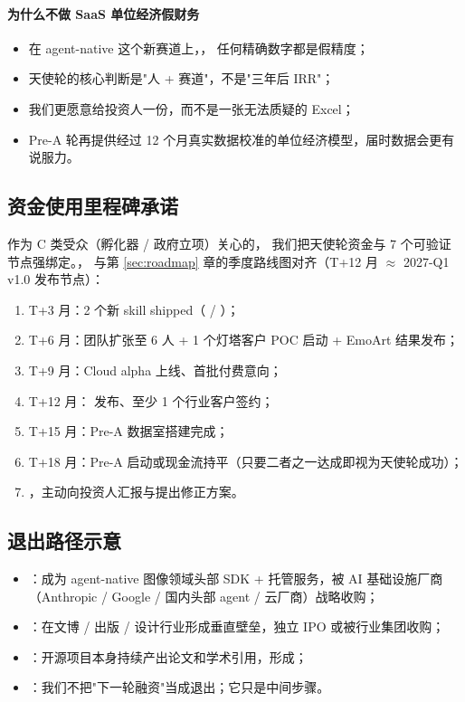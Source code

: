 \paragraph{为什么不做 SaaS 单位经济假财务}
\begin{itemize}
  \item 在 agent-native 这个新赛道上，，
  任何精确数字都是假精度；
  \item 天使轮的核心判断是"人 + 赛道"，不是"三年后 IRR"；
  \item 我们更愿意给投资人一份，而不是一张无法质疑的 Excel；
  \item Pre-A 轮再提供经过 12 个月真实数据校准的单位经济模型，届时数据会更有说服力。
\end{itemize}

\subsection{资金使用里程碑承诺}

作为 C 类受众（孵化器 / 政府立项）关心的，
我们把天使轮资金与 7 个可验证节点强绑定。，
与第 \ref{sec:roadmap} 章的季度路线图对齐（T+12 月 $\approx$ 2027-Q1 v1.0 发布节点）：

\begin{enumerate}
  \item T+3 月：2 个新 skill shipped（ / ）；
  \item T+6 月：团队扩张至 6 人 + 1 个灯塔客户 POC 启动 + EmoArt 结果发布；
  \item T+9 月：Cloud alpha 上线、首批付费意向；
  \item T+12 月： 发布、至少 1 个行业客户签约；
  \item T+15 月：Pre-A 数据室搭建完成；
  \item T+18 月：Pre-A 启动或现金流持平（只要二者之一达成即视为天使轮成功）；
  \item {}，主动向投资人汇报与提出修正方案。
\end{enumerate}

\subsection{退出路径示意}

\begin{itemize}
  \item {}：成为 agent-native 图像领域头部 SDK + 托管服务，被 AI 基础设施厂商（Anthropic / Google / 国内头部 agent / 云厂商）战略收购；
  \item {}：在文博 / 出版 / 设计行业形成垂直壁垒，独立 IPO 或被行业集团收购；
  \item {}：开源项目本身持续产出论文和学术引用，形成；
  \item {}：我们不把"下一轮融资"当成退出；它只是中间步骤。
\end{itemize}

